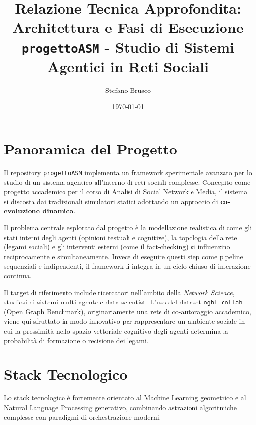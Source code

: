\documentclass[11pt, a4paper]{article}
\title{\textbf{Relazione Tecnica Approfondita: Architettura e Fasi di Esecuzione}\\ \large \texttt{progettoASM} - Studio di Sistemi Agentici in Reti Sociali}
\author{Stefano Brusco}
\date{\today}
\begin{document}
\maketitle

\tableofcontents
\newpage

\section{Panoramica del Progetto}

Il repository \href{https://github.com/stefaano19/progettoASM}{\texttt{progettoASM}} implementa un framework sperimentale avanzato per lo studio di un sistema agentico all'interno di reti sociali complesse. Concepito come progetto accademico per il corso di Analisi di Social Network e Media, il sistema si discosta dai tradizionali simulatori statici adottando un approccio di \textbf{co-evoluzione dinamica}.

Il problema centrale esplorato dal progetto è la modellazione realistica di come gli stati interni degli agenti (opinioni testuali e cognitive), la topologia della rete (legami sociali) e gli interventi esterni (come il fact-checking) si influenzino reciprocamente e simultaneamente. Invece di eseguire questi step come pipeline sequenziali e indipendenti, il framework li integra in un ciclo chiuso di interazione continua.

Il target di riferimento include ricercatori nell'ambito della \textit{Network Science}, studiosi di sistemi multi-agente e data scientist. L'uso del dataset \texttt{ogbl-collab} (Open Graph Benchmark), originariamente una rete di co-autoraggio accademico, viene qui sfruttato in modo innovativo per rappresentare un ambiente sociale in cui la prossimità nello spazio vettoriale cognitivo degli agenti determina la probabilità di formazione o recisione dei legami.

\section{Stack Tecnologico}

Lo stack tecnologico è fortemente orientato al Machine Learning geometrico e al Natural Language Processing generativo, combinando astrazioni algoritmiche complesse con paradigmi di orchestrazione moderni.
\end{document}
